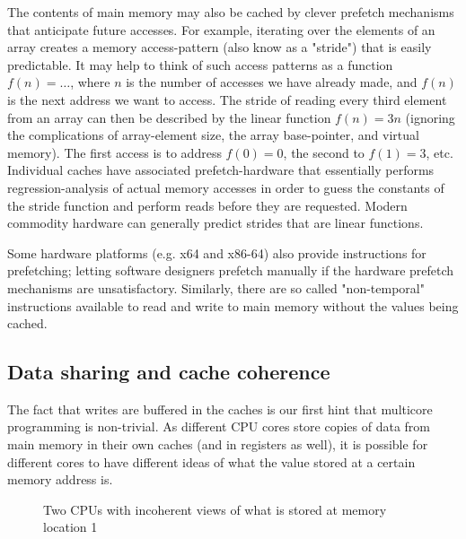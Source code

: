 The contents of main memory may also be cached by clever prefetch mechanisms that
anticipate future accesses. For example, iterating over the elements of an array
creates a memory access-pattern (also know as a "stride") that is easily
predictable. It may help to think of such access patterns as a function $f(n) =
\ldots$, where $n$ is the number of accesses we have already made, and $f(n)$ is
the next address we want to access. The stride of reading every third element
from an array can then be described by the linear function $f(n) = 3n$ (ignoring
the complications of array-element size, the array base-pointer, and virtual
memory).
The first access is to address $f(0) = 0$, the second to $f(1) = 3$, etc.
Individual caches have associated prefetch-hardware that essentially performs
regression-analysis of actual memory accesses in order to guess the constants of
the stride function and perform reads before they are requested. Modern
commodity hardware can generally predict strides that are linear functions.

Some hardware platforms (e.g. x64 and x86-64) also provide instructions for
prefetching; letting software designers prefetch manually if the hardware
prefetch mechanisms are unsatisfactory\cite{whatprogrammersshouldknow}.
Similarly, there are so called "non-temporal" instructions available to read and
write to main memory without the values being cached.

\subsection{Data sharing and cache coherence}
The fact that writes are buffered in the caches is our first hint that
multicore programming is non-trivial. As different CPU cores store copies
of data from main memory in their own caches (and in registers as well), it is
possible for different cores to have different ideas of what the value stored at
a certain memory address is.

\begin{figure}[ht]
	\caption{Two CPUs with incoherent views of what is stored at memory
	location 1}
	\label{fig:incoherence}
\end{figure}

